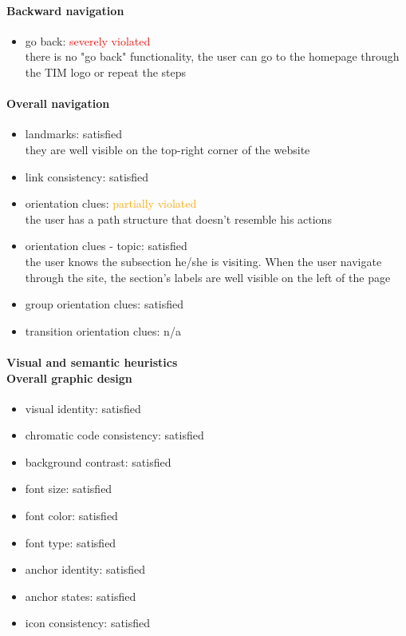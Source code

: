 \begin{enumerate}
	\paragraph*{Backward navigation}
	\begin{itemize}
		\item go back: \textcolor{red}{severely violated}\\
		there is no "go back" functionality, the user can go to the homepage through the TIM logo or repeat the steps
	\end{itemize}
	
	\paragraph*{Overall navigation}
	\begin{itemize}
		\item landmarks: satisfied\\
		they are well visible on the top-right corner of the website 
		\item link consistency: satisfied
		\item orientation clues: \textcolor{orange}{partially violated}\\
		the user has a path structure that doesn't resemble his actions
		\item orientation clues - topic: satisfied\\
		the user knows the subsection he/she is visiting. When the user navigate through the site, the section's labels are well visible on the left of the page
		\item group orientation clues: satisfied
		\item transition orientation clues: n/a
	\end{itemize}	
	
	\paragraph*{Visual and semantic heuristics \\ Overall graphic design }
	\begin{itemize}
		\item visual identity: satisfied
		\item chromatic code consistency: satisfied
		\item background contrast: satisfied
		\item font size: satisfied
		\item font color: satisfied
		\item font type: satisfied
		\item anchor identity: satisfied
		\item anchor states: satisfied
		\item icon consistency: satisfied
	\end{itemize}
	

\end{enumerate}
